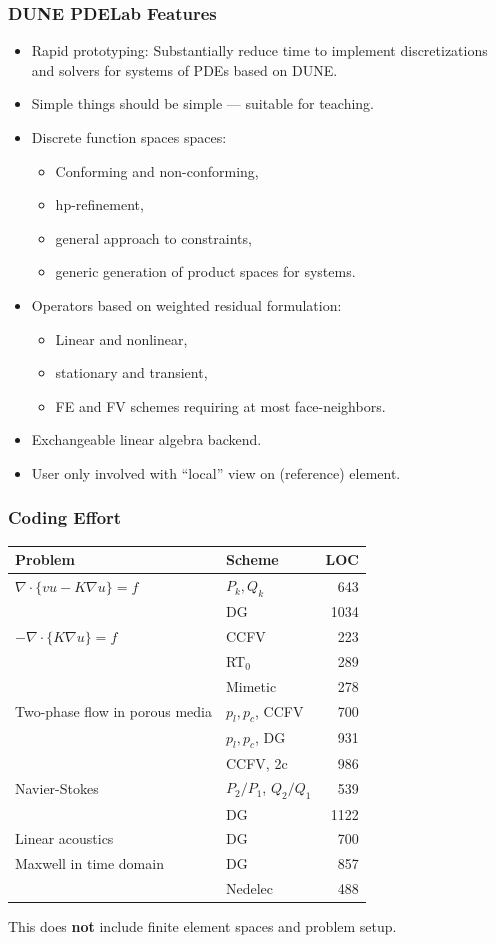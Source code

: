 \begin{frame}
\frametitle<presentation>{DUNE PDELab Features}
\begin{itemize}
\item Rapid prototyping: Substantially reduce time to implement
discretizations and solvers for systems of PDEs based on DUNE.
\item Simple things should be simple --- suitable for teaching.
\item Discrete function spaces spaces:
\begin{itemize}
\item Conforming and non-conforming,
\item hp-refinement,
\item general approach to constraints,
\item generic generation of product spaces for systems.
\end{itemize} 
\item Operators based on weighted residual formulation:
\begin{itemize}
\item Linear and nonlinear,
\item stationary and transient,
\item FE and FV schemes requiring at most face-neighbors.
\end{itemize} 
\item Exchangeable linear algebra backend. 
\item User only involved with ``local'' view on (reference) element.
\end{itemize}
\end{frame}

\begin{frame}
\frametitle<presentation>{Coding Effort}
\begin{center}
\small\begin{tabular}{|p{}|p{}|r|}
\hline
Problem & Scheme & LOC \\
\hline
\hline
$\nabla\cdot\{v u - K\nabla u\}=f$ & $P_k, Q_k$ & 643 \\
 & DG & 1034 \\
\hline
$-\nabla\cdot\{K\nabla u\}=f$ & CCFV & 223 \\
 & RT$_0$ & 289 \\
 & Mimetic & 278 \\
\hline
Two-phase flow in porous media & $p_l, p_c$, CCFV & 700 \\
& $p_l, p_c$, DG & 931 \\  
& CCFV, 2c & 986 \\
\hline
Navier-Stokes & $P_2/P_1$, $Q_2/Q_1$ & 539 \\
           & DG & 1122 \\
\hline
Linear acoustics & DG & 700 \\
\hline
Maxwell in time domain & DG & 857 \\
 & Nedelec & 488 \\
\hline
\end{tabular}
\end{center}
This does \textbf{not} include finite element spaces and problem setup.
\end{frame}

